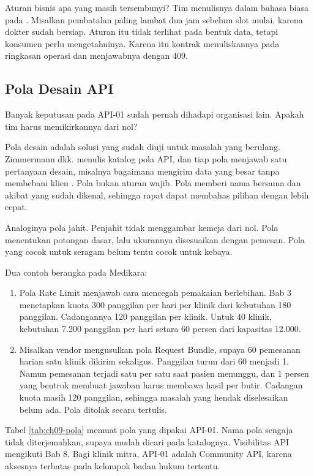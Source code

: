 Aturan bisnis apa yang masih tersembunyi? Tim menulisnya dalam bahasa biasa pada . Misalkan
pembatalan paling lambat dua jam sebelum slot mulai, karena dokter sudah bersiap. Aturan itu tidak terlihat pada bentuk data, tetapi konsumen
perlu mengetahuinya. Karena itu kontrak menuliskannya pada ringkasan operasi dan menjawabnya dengan 409.

\subsection{Pola Desain API}

Banyak keputusan pada API-01 sudah pernah dihadapi organisasi lain. Apakah tim harus memikirkannya dari nol?

Pola desain adalah solusi yang sudah diuji untuk masalah yang berulang. Zimmermann dkk. menulis katalog pola API, dan tiap pola menjawab satu
pertanyaan desain, misalnya bagaimana mengirim data yang besar tanpa membebani klien \cite{zimmermann2022patterns}. Pola bukan aturan wajib.
Pola memberi nama bersama dan akibat yang sudah dikenal, sehingga rapat dapat membahas pilihan dengan lebih cepat.

Analoginya pola jahit. Penjahit tidak menggambar kemeja dari nol. Pola menentukan potongan dasar, lalu ukurannya disesuaikan dengan pemesan.
Pola yang cocok untuk seragam belum tentu cocok untuk kebaya.

Dua contoh berangka pada Medikara:
\begin{enumerate}
  \item Pola Rate Limit menjawab cara mencegah pemakaian berlebihan. Bab 3 menetapkan kuota 300 panggilan per hari per klinik dari kebutuhan
        180 panggilan. Cadangannya 120 panggilan per klinik. Untuk 40 klinik, kebutuhan 7.200 panggilan per hari setara 60 persen dari
        kapasitas 12.000.
  \item Misalkan vendor mengusulkan pola Request Bundle, supaya 60 pemesanan harian satu klinik dikirim sekaligus. Panggilan turun dari 60
        menjadi 1. Namun pemesanan terjadi satu per satu saat pasien menunggu, dan 1 persen yang bentrok membuat jawaban harus membawa hasil per
        butir. Cadangan kuota masih 120 panggilan, sehingga masalah yang hendak diselesaikan belum ada. Pola ditolak secara tertulis.
\end{enumerate}

Tabel \ref{tab:ch09-pola} memuat pola yang dipakai API-01. Nama pola sengaja tidak diterjemahkan, supaya mudah dicari pada katalognya.
Visibilitas API mengikuti Bab 8. Bagi klinik mitra, API-01 adalah Community API, karena aksesnya terbatas pada kelompok badan hukum tertentu.

